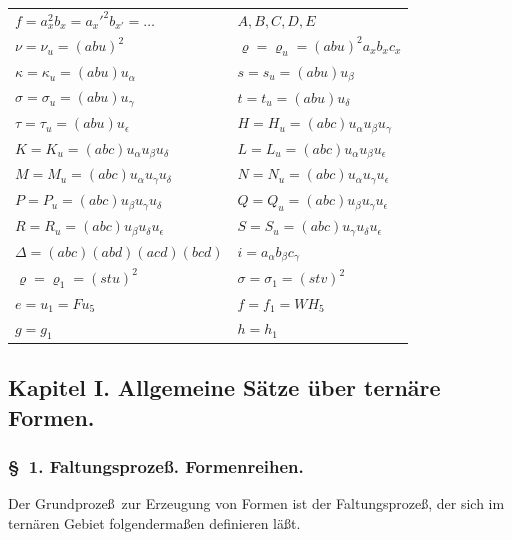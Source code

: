 \documentclass[11pt,a4paper]{article}
\theoremstyle{plain}
\theoremstyle{definition}
\begin{document}
\begin{center}
\begin{tabular}{ll}
$f = a_x^2 b_x = a_x'^2 b_{x'} = \dots$ & $A, B, C, D, E$ \\[0.3em]
$\nu = \nu_u = (abu)^2$ & $\varrho = \varrho_u = (abu)^2 a_x b_x c_x$ \\[0.3em]
$\kappa = \kappa_u = (abu) u_\alpha$ & $s = s_u = (abu) u_\beta$ \\[0.3em]
$\sigma = \sigma_u = (abu) u_\gamma$ & $t = t_u = (abu) u_\delta$ \\[0.3em]
$\tau = \tau_u = (abu) u_\epsilon$ & $H = H_u = (abc) u_\alpha u_\beta u_\gamma$ \\[0.3em]
$K = K_u = (abc) u_\alpha u_\beta u_\delta$ & $L = L_u = (abc) u_\alpha u_\beta u_\epsilon$ \\[0.3em]
$M = M_u = (abc) u_\alpha u_\gamma u_\delta$ & $N = N_u = (abc) u_\alpha u_\gamma u_\epsilon$ \\[0.3em]
$P = P_u = (abc) u_\beta u_\gamma u_\delta$ & $Q = Q_u = (abc) u_\beta u_\gamma u_\epsilon$ \\[0.3em]
$R = R_u = (abc) u_\beta u_\delta u_\epsilon$ & $S = S_u = (abc) u_\gamma u_\delta u_\epsilon$ \\[0.3em]
$\Delta = (abc)(abd)(acd)(bcd)$ & $i = a_\alpha b_\beta c_\gamma$ \\[0.3em]
$\varrho = \varrho_1 = (stu)^2$ & $\sigma = \sigma_1 = (stv)^2$ \\[0.3em]
$e = u_1 = F u_5$ & $f = f_1 = W H_5$ \\[0.3em]
$g = g_1$ & $h = h_1$ \\[0.3em]
\end{tabular}
\end{center}

\clearpage

\subsection*{Kapitel I. Allgemeine S\"atze \"uber tern\"are Formen.}

\subsubsection*{\S~1. Faltungsproze\ss. Formenreihen.}

Der Grundproze\ss\ zur Erzeugung von Formen ist der Faltungsproze\ss, der sich im tern\"aren Gebiet folgenderma\ss en definieren l\"a\ss t.
\end{document}
